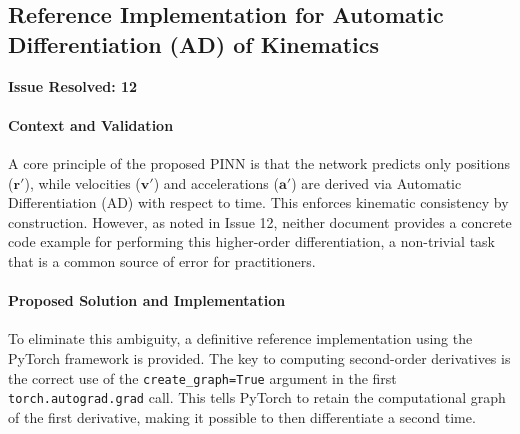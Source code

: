 \subsection{Reference Implementation for Automatic Differentiation (AD) of Kinematics}
\textbf{Issue Resolved: 12}
\paragraph{Context and Validation}
A core principle of the proposed PINN is that the network predicts only positions ($\mathbf{r}'$), while velocities ($\mathbf{v}'$) and accelerations ($\mathbf{a}'$) are derived via Automatic Differentiation (AD) with respect to time. This enforces kinematic consistency by construction. However, as noted in Issue 12, neither document provides a concrete code example for performing this higher-order differentiation, a non-trivial task that is a common source of error for practitioners.

\paragraph{Proposed Solution and Implementation}
To eliminate this ambiguity, a definitive reference implementation using the PyTorch framework is provided. The key to computing second-order derivatives is the correct use of the \texttt{create\_graph=True} argument in the first \texttt{torch.autograd.grad} call. This tells PyTorch to retain the computational graph of the first derivative, making it possible to then differentiate a second time.

